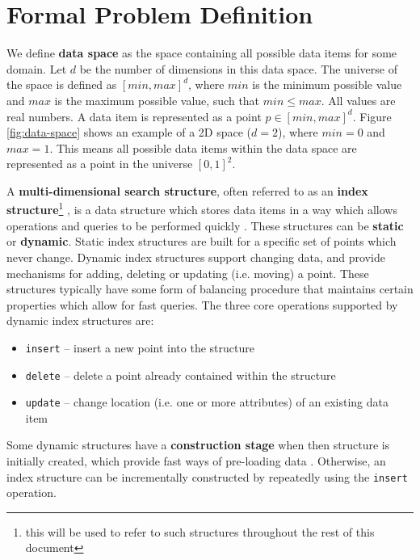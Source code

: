 \section{Formal Problem Definition}
\label{sec:definition}

We define \textbf{data space} as the space containing all possible data items for some domain. Let $d$ be the number of dimensions in this data space. The universe of the space is defined as $[min,max]^d$, where $min$ is the minimum possible value and $max$ is the maximum possible value, such that $min \leq max$. All values are real numbers. A data item is represented as a point $p \in [min,max]^d$. Figure \ref{fig:data-space} shows an example of a 2D space ($d = 2$), where $min = 0$ and $max = 1$. This means all possible data items within the data space are represented as a point in the universe $[0, 1]^2$.

A \textbf{multi-dimensional search structure}, often referred to as an \textbf{index structure}\footnote{this will be used to refer to such structures throughout the rest of this document} \cite{r-tree-variants}, is a data structure which stores data items in a way which allows operations and queries to be performed quickly \cite{dynamic-data-structures}. These structures can be \textbf{static} or \textbf{dynamic}. Static index structures are built for a specific set of points which never change. Dynamic index structures support changing data, and provide mechanisms for adding, deleting or updating (i.e. moving) a point. These structures typically have some form of balancing procedure \cite{dynamic-data-structures} that maintains certain properties which allow for fast queries. The three core operations supported by dynamic index structures are:
\begin{itemize}
	\item \texttt{insert} -- insert a new point into the structure
	\item \texttt{delete} -- delete a point already contained within the structure
	\item \texttt{update} -- change location (i.e. one or more attributes) of an existing data item
\end{itemize}
Some dynamic structures have a \textbf{construction stage} when then structure is initially created, which provide fast ways of pre-loading data \cite{pyramid-tree}. Otherwise, an index structure can be incrementally constructed by repeatedly using the \texttt{insert} operation.

